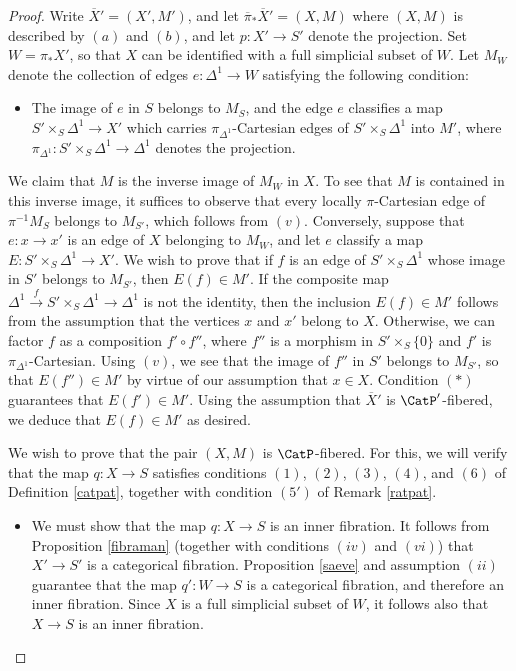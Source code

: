 \begin{proof}
Write $\overline{X}' = (X', M')$, and let $\overline{\pi}_{\ast} \overline{X}' = (X,M)$ where
$(X,M)$ is described by $(a)$ and $(b)$, and let $p: X' \rightarrow S'$ denote the projection.
Set $W = \pi_{\ast} X'$, so that $X$ can be identified with a full simplicial subset of $W$. 
Let $M_W$ denote the collection of edges $e: \Delta^1 \rightarrow W$ satisfying the following condition:
\begin{itemize}
\item[$(\ast)$] The image of $e$ in $S$ belongs to $M_{S}$, and the edge $e$ classifies a map $S' \times_{S} \Delta^1 \rightarrow X'$ which
carries $\pi_{\Delta^1}$-Cartesian edges of $S' \times_{S} \Delta^1$ into $M'$, where
$\pi_{\Delta^1}: S' \times_{S} \Delta^1 \rightarrow \Delta^1$ denotes the projection.
\end{itemize}
We claim that $M$ is the inverse image of $M_W$ in $X$. To see that $M$ is contained
in this inverse image, it suffices to observe that every locally $\pi$-Cartesian edge of $\pi^{-1} M_S$ belongs
to $M_{S'}$, which follows from $(v)$. Conversely, suppose that $e: x \rightarrow x'$ is an edge of $X$ belonging
to $M_{W}$, and let $e$ classify a map $E: S' \times_{S} \Delta^1 \rightarrow X'$.
We wish to prove that if $f$ is an edge of $S' \times_{S} \Delta^1$ whose image in
$S'$ belongs to $M_{S'}$, then $E(f) \in M'$. If the composite map
$\Delta^1 \stackrel{f}{\rightarrow} S' \times_{S} \Delta^1 \rightarrow \Delta^1$
is not the identity, then the inclusion $E(f) \in M'$ follows from the assumption that
the vertices $x$ and $x'$ belong to $X$. Otherwise, we can factor
$f$ as a composition $f' \circ f''$, where $f''$ is a morphism in
$S' \times_{S} \{0\}$ and $f'$ is $\pi_{\Delta^1}$-Cartesian. Using $(v)$, we see that
the image of $f''$ in $S'$ belongs to $M_{S'}$, so that $E(f'') \in M'$ by virtue of our assumption
that $x \in X$. Condition $(\ast)$ guarantees that $E(f') \in M'$. Using the assumption that
$\overline{X}'$ is $\CatP'$-fibered, we deduce that $E(f) \in M'$ as desired.

We wish to prove that the pair $(X,M)$ is $\CatP$-fibered. For this, we will verify that the map
$q: X \rightarrow S$ satisfies conditions $(1)$, $(2)$, $(3)$, $(4)$, and $(6)$ of Definition \ref{catpat}, together with condition $(5')$ of Remark \ref{ratpat}.

\begin{itemize}
\item[$(1)$] We must show that the map $q: X \rightarrow S$ is an inner fibration.
It follows from Proposition \ref{fibraman} (together with conditions $(iv)$ and $(vi)$) that  $X' \rightarrow S'$ is a categorical fibration. 
Proposition \ref{saeve} and assumption $(ii)$ guarantee that the map $q': W \rightarrow S$ is a categorical fibration, and therefore an inner fibration. Since $X$ is a full simplicial subset of $W$, it follows also that $X \rightarrow S$ is an inner fibration.


\end{itemize}
\end{proof}
